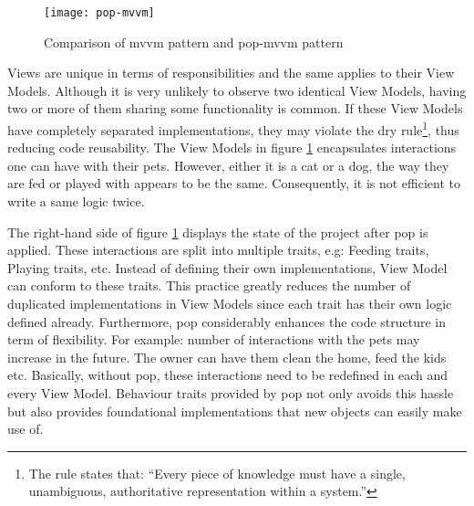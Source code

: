 \documentclass[11pt,a4paper,oneside,article]{memoir}
\begin{document}
    \iftrue
    \begin{figure}[H]
    
    \centering
    \texttt{[image: pop-mvvm]}
    
    \caption{Comparison of \gls{mvvm} pattern and \gls{pop-mvvm} pattern}
    \label{fig:pop-mvvm}
    
    \end{figure}
    \fi
    
Views are unique in terms of responsibilities and the same applies to their View Models. Although it is very unlikely to observe two identical View Models, having two or more of them sharing some functionality is common. If these View Models have completely separated implementations, they may violate the \Gls{dry} rule\footnote{The rule states that: ``Every piece of knowledge must have a single, unambiguous, authoritative
representation within a system.''\cite[p. 46]{andrew:pragmatic}}, thus reducing code reusability. The View Models in figure \ref{fig:pop-mvvm} encapsulates interactions one can have with their pets. However, either it is a cat or a dog, the way they are fed or played with appears to be the same. Consequently, it is not efficient to write a same logic twice. 

The right-hand side of figure \ref{fig:pop-mvvm} displays the state of the project after \gls{pop} is applied. These interactions are split into multiple traits, e.g: Feeding \glspl{trait}, Playing \glspl{trait}, etc. Instead of defining their own implementations, View Model can conform to these \glspl{trait}. This practice greatly reduces the number of duplicated implementations in View Models since each \gls{trait} has their own logic defined already. Furthermore, \gls{pop} considerably enhances the code structure in term of flexibility. For example: number of interactions with the pets may increase in the future. The owner can have them clean the home, feed the kids etc. Basically, without \gls{pop}, these interactions need to be redefined in each and every View Model. Behaviour \glspl{trait} provided by \gls{pop} not only avoids this hassle but also provides foundational implementations that new objects can easily make use of.

    
\end{document}
